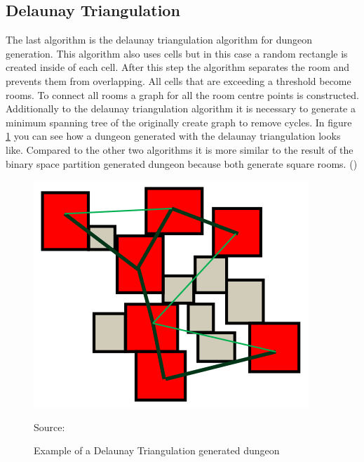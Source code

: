 \documentclass[a4paper,11pt,oneside]{scrreprt}
\begin{document}
\subsection{Delaunay Triangulation}
\label{subsection:delaunay-triangulation}
The last algorithm is the delaunay triangulation algorithm for dungeon generation. This algorithm also uses cells but in this case a random rectangle is created inside of each cell. After this step the algorithm separates the room and prevents them from overlapping. All cells that are exceeding a threshold become rooms. To connect all rooms a graph for all the room centre points is constructed. Additionally to the delaunay triangulation algorithm it is necessary to generate a minimum spanning tree of the originally create graph to remove cycles. In figure \ref{fig:delaunay_example} you can see how a dungeon generated with the delaunay triangulation looks like. Compared to the other two algorithms it is more similar to the result of the binary space partition generated dungeon because both generate square rooms. (\cite[][]{williams_investigation_nodate})

\begin{figure}[ht]
	\centering
	\includegraphics[scale=0.6]{images/delaunay_example.png} 
	\caption{Example of a Delaunay Triangulation generated dungeon}
	Source: \cite[][]{williams_investigation_nodate}
	\label{fig:delaunay_example}
\end{figure}
\end{document}
